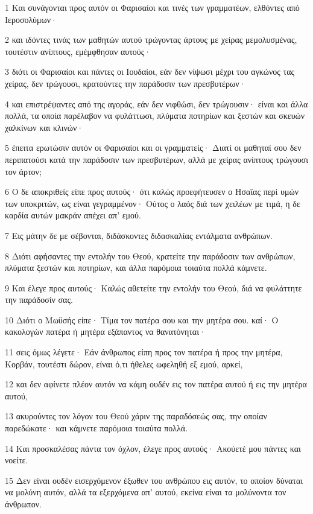\par 1 Και συνάγονται προς αυτόν οι Φαρισαίοι και τινές των γραμματέων, ελθόντες από Ιεροσολύμων·
\par 2 και ιδόντες τινάς των μαθητών αυτού τρώγοντας άρτους με χείρας μεμολυσμένας, τουτέστιν ανίπτους, εμέμφθησαν αυτούς·
\par 3 διότι οι Φαρισαίοι και πάντες οι Ιουδαίοι, εάν δεν νίψωσι μέχρι του αγκώνος τας χείρας, δεν τρώγουσι, κρατούντες την παράδοσιν των πρεσβυτέρων·
\par 4 και επιστρέψαντες από της αγοράς, εάν δεν νιφθώσι, δεν τρώγουσιν· είναι και άλλα πολλά, τα οποία παρέλαβον να φυλάττωσι, πλύματα ποτηρίων και ξεστών και σκευών χαλκίνων και κλινών·
\par 5 έπειτα ερωτώσιν αυτόν οι Φαρισαίοι και οι γραμματείς· Διατί οι μαθηταί σου δεν περιπατούσι κατά την παράδοσιν των πρεσβυτέρων, αλλά με χείρας ανίπτους τρώγουσι τον άρτον;
\par 6 Ο δε αποκριθείς είπε προς αυτούς· ότι καλώς προεφήτευσεν ο Ησαΐας περί υμών των υποκριτών, ως είναι γεγραμμένον· Ούτος ο λαός διά των χειλέων με τιμά, η δε καρδία αυτών μακράν απέχει απ' εμού.
\par 7 Εις μάτην δε με σέβονται, διδάσκοντες διδασκαλίας εντάλματα ανθρώπων.
\par 8 Διότι αφήσαντες την εντολήν του Θεού, κρατείτε την παράδοσιν των ανθρώπων, πλύματα ξεστών και ποτηρίων, και άλλα παρόμοια τοιαύτα πολλά κάμνετε.
\par 9 Και έλεγε προς αυτούς· Καλώς αθετείτε την εντολήν του Θεού, διά να φυλάττητε την παράδοσίν σας.
\par 10 Διότι ο Μωϋσής είπε· Τίμα τον πατέρα σου και την μητέρα σου. καί· Ο κακολογών πατέρα ή μητέρα εξάπαντος να θανατόνηται·
\par 11 σεις όμως λέγετε· Εάν άνθρωπος είπη προς τον πατέρα ή προς την μητέρα, Κορβάν, τουτέστι δώρον, είναι ό,τι ήθελες ωφεληθή εξ εμού, αρκεί,
\par 12 και δεν αφίνετε πλέον αυτόν να κάμη ουδέν εις τον πατέρα αυτού ή εις την μητέρα αυτού,
\par 13 ακυρούντες τον λόγον του Θεού χάριν της παραδόσεώς σας, την οποίαν παρεδώκατε· και κάμνετε παρόμοια τοιαύτα πολλά.
\par 14 Και προσκαλέσας πάντα τον όχλον, έλεγε προς αυτούς· Ακούετέ μου πάντες και νοείτε.
\par 15 Δεν είναι ουδέν εισερχόμενον έξωθεν του ανθρώπου εις αυτόν, το οποίον δύναται να μολύνη αυτόν, αλλά τα εξερχόμενα απ' αυτού, εκείνα είναι τα μολύνοντα τον άνθρωπον.
